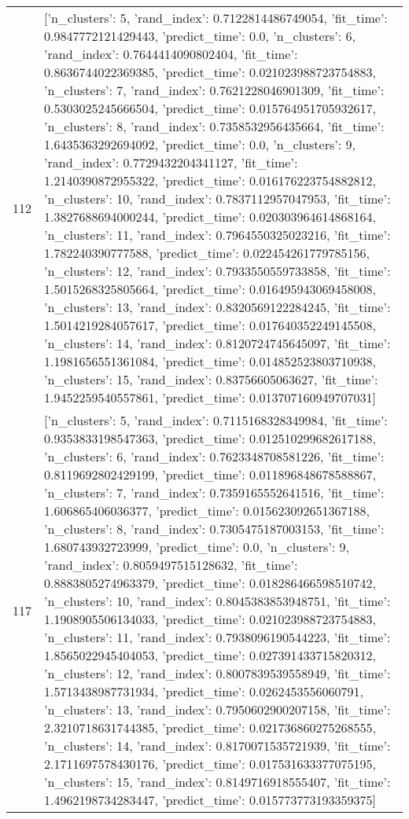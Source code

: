 \begin{tabular}{rl}
112 & [{'n_clusters': 5, 'rand_index': 0.7122814486749054, 'fit_time': 0.9847772121429443, 'predict_time': 0.0}, {'n_clusters': 6, 'rand_index': 0.7644414090802404, 'fit_time': 0.8636744022369385, 'predict_time': 0.021023988723754883}, {'n_clusters': 7, 'rand_index': 0.7621228046901309, 'fit_time': 0.5303025245666504, 'predict_time': 0.015764951705932617}, {'n_clusters': 8, 'rand_index': 0.7358532956435664, 'fit_time': 1.6435363292694092, 'predict_time': 0.0}, {'n_clusters': 9, 'rand_index': 0.7729432204341127, 'fit_time': 1.2140390872955322, 'predict_time': 0.016176223754882812}, {'n_clusters': 10, 'rand_index': 0.7837112957047953, 'fit_time': 1.3827688694000244, 'predict_time': 0.020303964614868164}, {'n_clusters': 11, 'rand_index': 0.7964550325023216, 'fit_time': 1.782240390777588, 'predict_time': 0.022454261779785156}, {'n_clusters': 12, 'rand_index': 0.7933550559733858, 'fit_time': 1.5015268325805664, 'predict_time': 0.016495943069458008}, {'n_clusters': 13, 'rand_index': 0.8320569122284245, 'fit_time': 1.5014219284057617, 'predict_time': 0.017640352249145508}, {'n_clusters': 14, 'rand_index': 0.8120724745645097, 'fit_time': 1.1981656551361084, 'predict_time': 0.014852523803710938}, {'n_clusters': 15, 'rand_index': 0.83756605063627, 'fit_time': 1.9452259540557861, 'predict_time': 0.013707160949707031}] \\
117 & [{'n_clusters': 5, 'rand_index': 0.7115168328349984, 'fit_time': 0.9353833198547363, 'predict_time': 0.012510299682617188}, {'n_clusters': 6, 'rand_index': 0.7623348708581226, 'fit_time': 0.8119692802429199, 'predict_time': 0.011896848678588867}, {'n_clusters': 7, 'rand_index': 0.7359165552641516, 'fit_time': 1.606865406036377, 'predict_time': 0.015623092651367188}, {'n_clusters': 8, 'rand_index': 0.7305475187003153, 'fit_time': 1.680743932723999, 'predict_time': 0.0}, {'n_clusters': 9, 'rand_index': 0.8059497515128632, 'fit_time': 0.8883805274963379, 'predict_time': 0.018286466598510742}, {'n_clusters': 10, 'rand_index': 0.8045383853948751, 'fit_time': 1.1908905506134033, 'predict_time': 0.021023988723754883}, {'n_clusters': 11, 'rand_index': 0.7938096190544223, 'fit_time': 1.8565022945404053, 'predict_time': 0.027391433715820312}, {'n_clusters': 12, 'rand_index': 0.8007839539558949, 'fit_time': 1.5713438987731934, 'predict_time': 0.0262453556060791}, {'n_clusters': 13, 'rand_index': 0.7950602900207158, 'fit_time': 2.3210718631744385, 'predict_time': 0.021736860275268555}, {'n_clusters': 14, 'rand_index': 0.8170071535721939, 'fit_time': 2.1711697578430176, 'predict_time': 0.017531633377075195}, {'n_clusters': 15, 'rand_index': 0.8149716918555407, 'fit_time': 1.4962198734283447, 'predict_time': 0.015773773193359375}] \\

\end{tabular}
